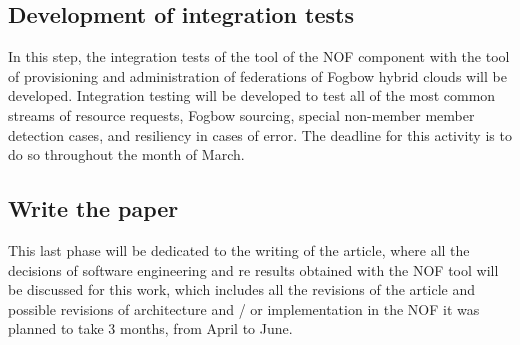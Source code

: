 \documentclass{article}
\begin{document}
\subsection{Development of integration tests}
    In this step, the integration tests of the tool of the NOF component with the tool of provisioning and administration of federations of Fogbow hybrid clouds will be developed. Integration testing will be developed to test all of the most common streams of resource requests, Fogbow sourcing, special non-member member detection cases, and resiliency in cases of error. The deadline for this activity is to do so throughout the month of March.
\subsection{Write the paper}
    This last phase will be dedicated to the writing of the article, where all the decisions of software engineering and re results obtained with the NOF tool will be discussed for this work, which includes all the revisions of the article and possible revisions of architecture and / or implementation in the NOF it was planned to take 3 months, from April to June.
    
\end{document}
